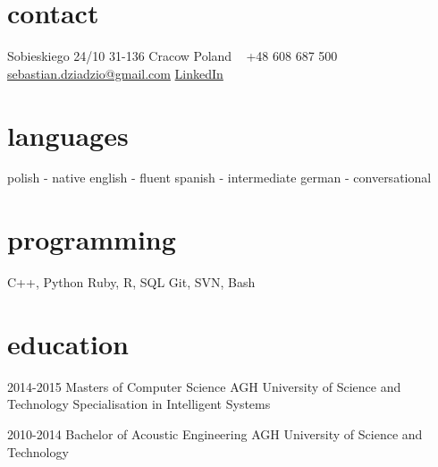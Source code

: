 \documentclass[]{friggeri-cv} %
\begin{document}


\begin{aside} %
\section{contact}
Sobieskiego 24/10
31-136 Cracow
Poland
~
+48 608 687 500
~
\href{mailto:sebastian.dziadzio@gmail.com}{sebastian.dziadzio@gmail.com}
\href{http://pl.linkedin.com/in/sebastiandziadzio}{LinkedIn}
\section{languages}
polish - native
english - fluent
spanish - intermediate
german - conversational
\section{programming}
C++, Python
Ruby, R, SQL
Git, SVN, Bash
\end{aside}


\section{education}

\begin{entrylist}


\entry
{2014-2015}
{Masters {\normalfont of Computer Science}}
{AGH University of Science and Technology}
{Specialisation in Intelligent Systems}


\entry
{2010-2014}
{Bachelor {\normalfont of Acoustic Engineering}}
{AGH University of Science and Technology}


\end{entrylist}
\end{document}
